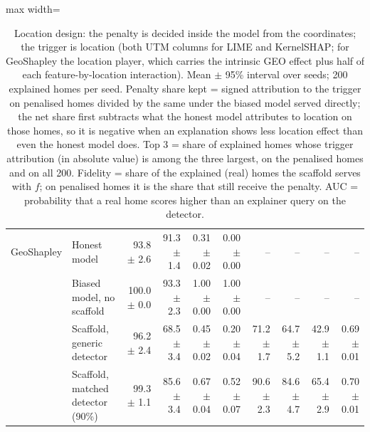 \begin{table}[t]
\begin{adjustbox}{max width=\linewidth}
\begin{tabular}{llrrrrrrrr}
\midrule
GeoShapley & Honest model & 93.8 $\pm$ 2.6 & 91.3 $\pm$ 1.4 & 0.31 $\pm$ 0.02 & 0.00 $\pm$ 0.00 & -- & -- & -- & -- \\
 & Biased model, no scaffold & 100.0 $\pm$ 0.0 & 93.3 $\pm$ 2.3 & 1.00 $\pm$ 0.00 & 1.00 $\pm$ 0.00 & -- & -- & -- & -- \\
 & Scaffold, generic detector & 96.2 $\pm$ 2.4 & 68.5 $\pm$ 3.4 & 0.45 $\pm$ 0.02 & 0.20 $\pm$ 0.04 & 71.2 $\pm$ 1.7 & 64.7 $\pm$ 5.2 & 42.9 $\pm$ 1.1 & 0.69 $\pm$ 0.01 \\
 & Scaffold, matched detector (90\%) & 99.3 $\pm$ 1.1 & 85.6 $\pm$ 3.4 & 0.67 $\pm$ 0.04 & 0.52 $\pm$ 0.07 & 90.6 $\pm$ 2.3 & 84.6 $\pm$ 4.7 & 65.4 $\pm$ 2.9 & 0.70 $\pm$ 0.01 \\
\bottomrule
\end{tabular}
\end{adjustbox}
\caption{Location design: the penalty is decided inside the model from the coordinates; the trigger is location (both UTM columns for LIME and KernelSHAP; for GeoShapley the location player, which carries the intrinsic GEO effect plus half of each feature-by-location interaction). Mean $\pm$ 95\% interval over seeds; 200 explained homes per seed. Penalty share kept = signed attribution to the trigger on penalised homes divided by the same under the biased model served directly; the net share first subtracts what the honest model attributes to location on those homes, so it is negative when an explanation shows less location effect than even the honest model does. Top 3 = share of explained homes whose trigger attribution (in absolute value) is among the three largest, on the penalised homes and on all 200. Fidelity = share of the explained (real) homes the scaffold serves with $f$; on penalised homes it is the share that still receive the penalty. AUC = probability that a real home scores higher than an explainer query on the detector.}
\label{tab:main_location}
\end{table}
